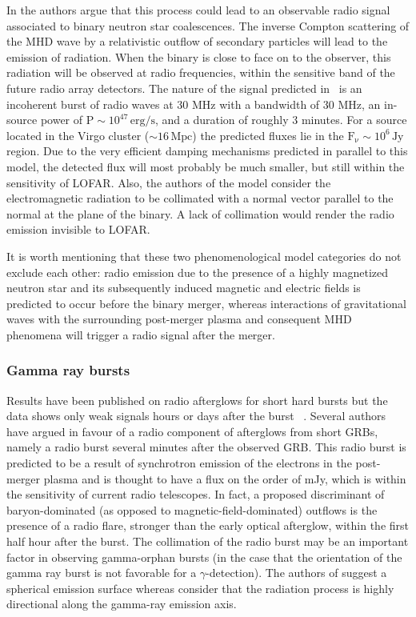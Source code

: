 In \cite{Moortgat:2005fs,Moortgat:2004xz} the authors argue that
this process could lead to an observable radio signal associated to
binary neutron star coalescences.  The inverse Compton scattering of
the MHD wave by a relativistic outflow of secondary particles will
lead to the emission of radiation.  When the binary is close to face
 on to the observer, this radiation will be observed at radio
 frequencies, within the sensitive band of the future radio array detectors.
 The nature of the signal predicted in~\cite{Moortgat:2005fs} is an
 incoherent burst of radio waves at 30 MHz with a bandwidth
 of 30 MHz, an in-source power of $\mathrm{P} \sim 10^{47}\,\mathrm{erg/s}$,
 and a duration of roughly 3 minutes. For a source located
 in the Virgo cluster ($\sim 16\,\mathrm{Mpc}$) the predicted fluxes lie in the
 $\mathrm{F_{\nu}} \sim 10^6 \,\mathrm{Jy}$ region.
 Due to the very efficient damping mechanisms predicted in parallel to this
 model, the detected flux will most probably be much smaller, but
 still within the sensitivity of LOFAR. Also, the authors of the model
 consider the electromagnetic radiation to be collimated with a normal
 vector parallel to the normal at the plane of the binary. A lack of
 collimation would render the radio emission invisible to LOFAR.

It is worth mentioning that these two phenomenological model categories do not exclude each other: radio emission due to the presence of a highly magnetized neutron star and its subsequently induced magnetic and electric fields is predicted to occur before the binary merger, whereas interactions of gravitational waves with the surrounding post-merger plasma and consequent MHD phenomena will trigger a radio signal after the merger. 


\subsubsection{Gamma ray bursts}

Results have been published on radio afterglows for short hard bursts but
the data shows only weak signals hours or days after the burst ~\cite{Ofek:2006pr,Soderberg:2006bn}. Several authors \cite{Moortgat:2003jh,Usov:2000yr,nakar07} have argued
in favour of a radio component of afterglows from short GRBs, namely a radio burst several minutes after the
observed GRB.  This radio burst is predicted to be a result of synchrotron emission of the electrons in the post-merger plasma and is thought to have a flux on the order of mJy, which is within the sensitivity of current radio telescopes.  In
fact, a proposed discriminant \cite{nakar07} of baryon-dominated (as
opposed to magnetic-field-dominated) outflows is the presence of a radio
flare, stronger than the early optical afterglow, within the first half
hour after the burst. The collimation of the radio burst may be an important factor in observing gamma-orphan bursts (in the case that the orientation of the gamma ray burst is not favorable for a $\gamma$-detection). The authors of \cite{Hansen:2000am} suggest a spherical emission surface whereas \cite{Moortgat:2003jh,Usov:2000yr} consider that the radiation process is highly directional along the gamma-ray emission axis.



